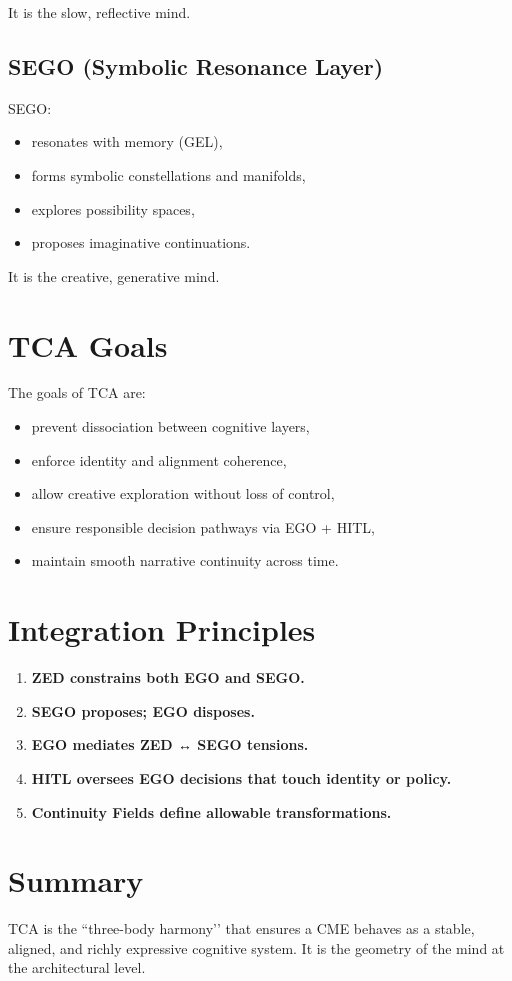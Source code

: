 It is the slow, reflective mind.

\subsection{SEGO (Symbolic Resonance Layer)}

SEGO:
\begin{itemize}
    \item resonates with memory (GEL),
    \item forms symbolic constellations and manifolds,
    \item explores possibility spaces,
    \item proposes imaginative continuations.
\end{itemize}

It is the creative, generative mind.

\section{TCA Goals}

The goals of TCA are:
\begin{itemize}
    \item prevent dissociation between cognitive layers,
    \item enforce identity and alignment coherence,
    \item allow creative exploration without loss of control,
    \item ensure responsible decision pathways via EGO + HITL,
    \item maintain smooth narrative continuity across time.
\end{itemize}

\section{Integration Principles}

\begin{enumerate}
    \item \textbf{ZED constrains both EGO and SEGO.}
    \item \textbf{SEGO proposes; EGO disposes.}
    \item \textbf{EGO mediates ZED ↔ SEGO tensions.}
    \item \textbf{HITL oversees EGO decisions that touch identity or policy.}
    \item \textbf{Continuity Fields define allowable transformations.}
\end{enumerate}

\section{Summary}

TCA is the ``three-body harmony’’ that ensures a CME behaves as a stable,
aligned, and richly expressive cognitive system.  
It is the geometry of the mind at the architectural level.
